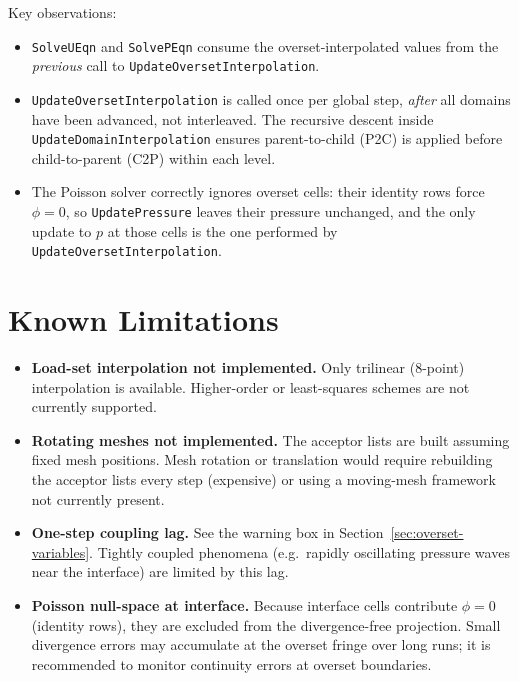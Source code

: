 \documentclass[12pt,a4paper]{article}
\begin{document}
Key observations:
\begin{itemize}
  \item \texttt{SolveUEqn} and \texttt{SolvePEqn} consume the
        overset-interpolated values from the \emph{previous} call to
        \texttt{UpdateOversetInterpolation}.

  \item \texttt{UpdateOversetInterpolation} is called once per global step,
        \emph{after} all domains have been advanced, not interleaved.
        The recursive descent inside \texttt{UpdateDomainInterpolation}
        ensures parent-to-child (P2C) is applied before
        child-to-parent (C2P) within each level.

  \item The Poisson solver correctly ignores overset cells: their identity
        rows force $\phi=0$, so \texttt{UpdatePressure} leaves their
        pressure unchanged, and the only update to $p$ at those cells
        is the one performed by \texttt{UpdateOversetInterpolation}.
\end{itemize}

\section{Known Limitations}
\label{sec:overset-limitations}

\begin{itemize}
  \item \textbf{Load-set interpolation not implemented.}
        Only trilinear (8-point) interpolation is available.
        Higher-order or least-squares schemes are not currently supported.

  \item \textbf{Rotating meshes not implemented.}
        The acceptor lists are built assuming fixed mesh positions.
        Mesh rotation or translation would require rebuilding the
        acceptor lists every step (expensive) or using a moving-mesh
        framework not currently present.

  \item \textbf{One-step coupling lag.}
        See the warning box in Section~\ref{sec:overset-variables}.
        Tightly coupled phenomena (e.g.\ rapidly oscillating pressure
        waves near the interface) are limited by this lag.

  \item \textbf{Poisson null-space at interface.}
        Because interface cells contribute $\phi=0$ (identity rows),
        they are excluded from the divergence-free projection.
        Small divergence errors may accumulate at the overset fringe
        over long runs; it is recommended to monitor continuity errors
        at overset boundaries.
\end{itemize}
\end{document}
